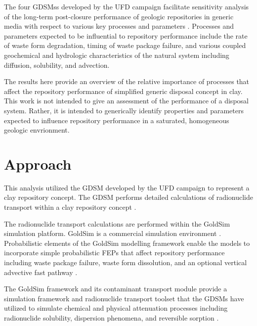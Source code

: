 
The four \glspl{GDSM}s developed by the \gls{UFD} campaign facilitate sensitivity 
analysis of the long-term post-closure performance of geologic repositories in 
generic media with respect to various key processes and parameters 
\cite{clayton_generic_2011}. Processes and parameters expected to be influential to repository 
performance  include the rate of waste form degradation, timing of waste package 
failure, and various coupled geochemical and hydrologic characteristics of the 
natural system including diffusion, solubility, and advection.

The results here provide an overview of the relative importance of processes 
that affect the repository performance of simplified generic disposal 
concept in clay. This work is not intended to give an assessment of the performance of a 
disposal system. Rather, it is intended to  
generically identify properties and parameters expected to influence repository 
performance in a saturated, homogeneous geologic envrionment.


\section{Approach}

This analysis utilized the \gls{GDSM} developed by the \gls{UFD} campaign to 
represent a clay repository concept. The \gls{GDSM} performs detailed 
calculations of radionuclide transport within a clay repository concept \cite{clayton_generic_2011}.  

The radionuclide transport calculations
are performed within the GoldSim simulation platform. GoldSim is a commercial 
simulation environment \cite{golder_goldsim_2010, golder_goldsim_ct_2010}.
Probabilistic elements of the GoldSim modelling framework enable the models to 
incorporate simple probabilistic \gls{FEPs} that affect repository performance 
including waste package failure, waste form dissolution, and an optional 
vertical advective fast pathway \cite{clayton_generic_2011}. 

The GoldSim framework and 
its contaminant transport module provide a simulation framework and 
radionuclide transport toolset that the \glspl{GDSM} have utilized to 
simulate chemical and physical attenuation processes including radionuclide 
solubility, dispersion phenomena, and reversible sorption 
\cite{golder_goldsim_2010, golder_goldsim_ct_2010}. 


